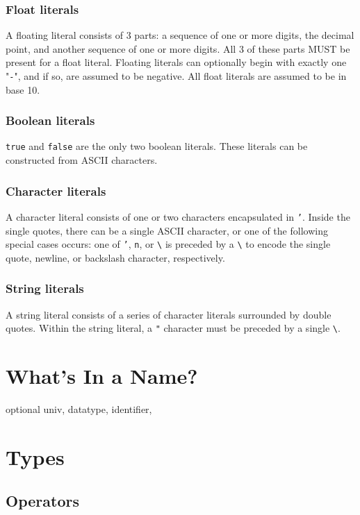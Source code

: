 \documentclass{article}
\begin{document}
\subsubsection{Float literals}
A floating literal consists of 3 parts: a sequence of one or more digits, the decimal point, and another sequence of one or more digits. All 3 of these parts MUST be present for a float literal. Floating literals can optionally begin with exactly one "\texttt{-}", and if so, are assumed to be negative. All float literals are assumed to be in base 10.

\subsubsection{Boolean literals}
\texttt{true} and \texttt{false} are the only two boolean literals. These literals can be constructed from ASCII characters. 

\subsubsection{Character literals}
A character literal consists of one or two characters encapsulated in \texttt{'}. Inside the single quotes, there can be a single ASCII character, or one of the following special cases occurs: one of \texttt{'}, \texttt{n}, or \texttt{\textbackslash} is preceded by a \texttt{\textbackslash} to encode the single quote, newline, or backslash character, respectively.

\subsubsection{String literals}
A string literal consists of a series of character literals surrounded by double quotes. Within the string literal, a \texttt{"} character must be preceded by a single \texttt{\textbackslash}.
\section{What's In a Name?}
optional univ, datatype, identifier, 
\section{Types}

\subsection{Operators}
\end{document}
